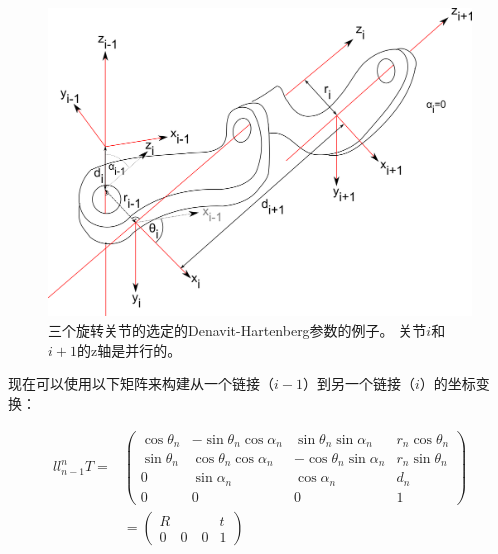 \begin{figure}
	\centering
		\includegraphics[width=\textwidth]{figs/denavit-hartenberg}
	\caption {三个旋转关节的选定的Denavit-Hartenberg参数的例子。 关节$ i $和$ i + 1$的z轴是并行的。}
	\label{fig:denavit}
\end{figure}




现在可以使用以下矩阵来构建从一个链接（$ i-1 $）到另一个链接（$ i $）的坐标变换：

\begin{eqnarray}{ll}
\nonumber
_{n-1}^nT=&
\left(
\begin{array}{ccc|c}
\cos \theta_n & -\sin \theta_n \cos\alpha_n & \sin\theta_n \sin\alpha_n & r_n \cos\theta_n\\
\sin \theta_n & \cos\theta_n \cos\alpha_n & -\cos\theta_n\sin\alpha_n & r_n \sin\theta_n\\
0 & \sin\alpha_n & \cos\alpha_n & d_n\\
\hline
0 & 0 & 0 & 1
\end{array}
\right)\\
&=
\left(
\begin{array}{c|c}
R & t\\
\hline
0 \quad 0 \quad 0 & 1
\end{array}
\right)
\end{eqnarray}

